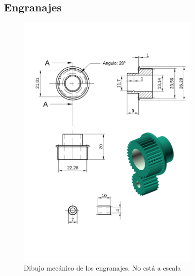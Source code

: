 \documentclass[12pt,a4paper]{article}
\begin{document}
    \subsection{Engranajes}
    \vfill
    \begin{figure}[H]
    \centering
    \includegraphics[width=0.8\textwidth]{fig/polarimetro/engranajes_mecanico}
    \caption{Dibujo mecánico de los engranajes. No está a escala}
    \label{fig:polarimetro/engranajes_plano}
    \end{figure}
    \vfill


    \clearpage
\end{document}
